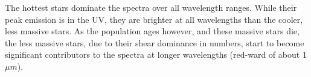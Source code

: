 \documentclass[11pt]{article}
\begin{document}
\begin{enumerate}
\begin{enumerate}
		The hottest stars dominate the spectra over all wavelength ranges. While their peak emission is in the UV, they are brighter at all wavelengths than the cooler, less massive stars. As the population ages however, and these massive stars die, the less massive stars, due to their shear dominance in numbers, start to become significant contributors to the spectra at longer wavelengths (red-ward of about 1 $\mu m$).\\
		
    
    \end{enumerate}
  
  
\end{enumerate}
\end{document}
